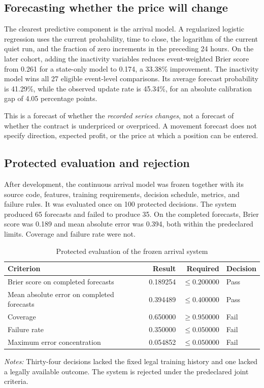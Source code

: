 \documentclass[11pt]{article}
\begin{document}
\subsection{Forecasting whether the price will change}

The clearest predictive component is the arrival model. A regularized logistic regression uses
the current probability, time to close, the logarithm of the current quiet run, and the fraction
of zero increments in the preceding 24 hours. On the later cohort, adding the inactivity
variables reduces event-weighted Brier score from 0.261 for a state-only model to 0.174, a 33.38\%
improvement. The inactivity model wins all 27 eligible event-level comparisons. Its average
forecast probability is 41.29\%, while the observed update rate is 45.34\%, for an absolute
calibration gap of 4.05 percentage points.

This is a forecast of whether the \emph{recorded series changes}, not a forecast of whether the
contract is underpriced or overpriced. A movement forecast does not specify direction, expected
profit, or the price at which a position can be entered.

\subsection{Protected evaluation and rejection}

After development, the continuous arrival model was frozen together with its source code,
features, training requirements, decision schedule, metrics, and failure rules. It was evaluated
once on 100 protected decisions. The system produced 65 forecasts and failed to produce 35. On
the completed forecasts, Brier score was 0.189 and mean absolute error was 0.394, both within the
predeclared limits. Coverage and failure rate were not.

\begin{table}[htbp]
\centering
\caption{Protected evaluation of the frozen arrival system}
\label{tab:protected}
\begin{tabular}{lrrl}
\toprule
Criterion & Result & Required & Decision \\
\midrule
Brier score on completed forecasts & 0.189254 & $\leq 0.200000$ & Pass \\
Mean absolute error on completed forecasts & 0.394489 & $\leq 0.400000$ & Pass \\
Coverage & 0.650000 & $\geq 0.950000$ & Fail \\
Failure rate & 0.350000 & $\leq 0.050000$ & Fail \\
Maximum error concentration & 0.054852 & $\leq 0.050000$ & Fail \\
\bottomrule
\end{tabular}
\begin{minipage}{0.92\textwidth}
\footnotesize \emph{Notes:} Thirty-four decisions lacked the fixed legal training history and one
lacked a legally available outcome. The system is rejected under the predeclared joint criteria.
\end{minipage}
\end{table}
\end{document}
